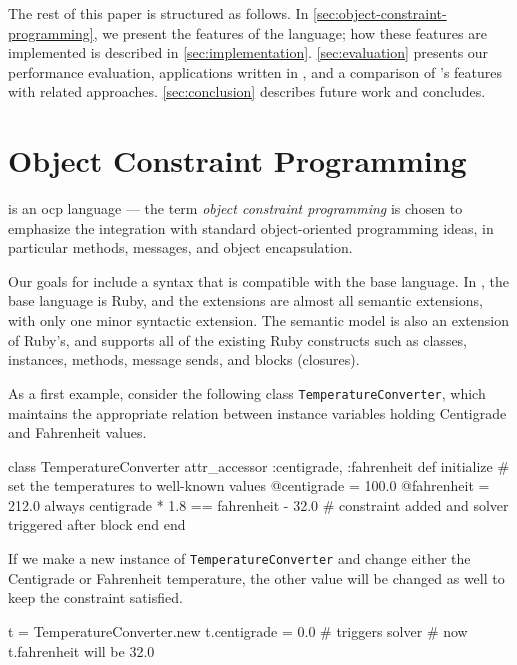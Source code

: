 The rest of this paper is structured as follows. In
\autoref{sec:object-constraint-programming}, we present the features
of the language; how these features are implemented is described in
\autoref{sec:implementation}. \autoref{sec:evaluation} presents our
performance evaluation, applications written in \toolname, and a
comparison of \langname's features with related
approaches. \autoref{sec:conclusion} describes future work and
concludes.

\section{Object Constraint Programming}
\label{sec:object-constraint-programming}

\langname is an \ac{ocp} language --- the term \emph{object constraint
  programming} is chosen to emphasize the integration with standard
object-oriented programming ideas, in particular methods, messages,
and object encapsulation.

Our goals for \langname include a syntax that is compatible with the
base language.  In \toolname, the base language is Ruby, and the
extensions are almost all semantic extensions, with only one minor
syntactic extension.  The semantic model is also an extension of
Ruby's, and supports all of the existing Ruby constructs such as
classes, instances, methods, message sends, and blocks (closures).

As a first example, consider the following class
\lstinline{TemperatureConverter}, which maintains the appropriate
relation between instance variables holding Centigrade and Fahrenheit
values.

\begin{code}
class TemperatureConverter
  attr_accessor :centigrade, :fahrenheit
  def initialize                                                                
    # set the temperatures to well-known values
    @centigrade = 100.0
    @fahrenheit = 212.0
    always { centigrade * 1.8 == fahrenheit - 32.0 }
    # constraint added and solver triggered after block
  end
end                                                                           
\end{code}

If we make a new instance of \lstinline{TemperatureConverter} and
change either the Centigrade or Fahrenheit temperature, the other
value will be changed as well to keep the constraint satisfied.

\begin{code}
t = TemperatureConverter.new
t.centigrade = 0.0 # triggers solver
# now t.fahrenheit will be 32.0
\end{code}

